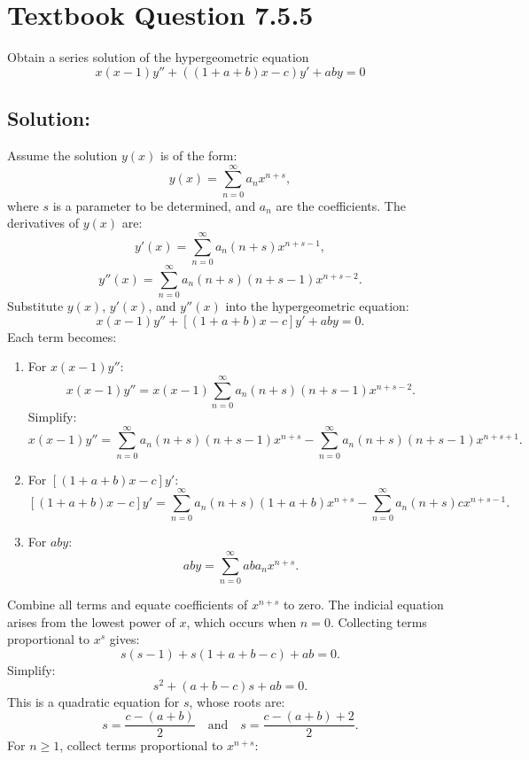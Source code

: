 \documentclass[12pt]{article}
\begin{document}
\section*{Textbook Question 7.5.5}
    Obtain a series solution of the hypergeometric equation
    \[
        x(x-1)y'' + \left((1 + a + b)x - c \right) y' + aby = 0
    \]
   
   \subsection*{Solution:}
        Assume the solution \(y(x)\) is of the form:
        \[
        y(x) = \sum_{n=0}^\infty a_n x^{n+s},
        \]
        where \(s\) is a parameter to be determined, and \(a_n\) are the coefficients.
        The derivatives of \(y(x)\) are:
        \[
        y'(x) = \sum_{n=0}^\infty a_n (n+s)x^{n+s-1},
        \]
        \[
        y''(x) = \sum_{n=0}^\infty a_n (n+s)(n+s-1)x^{n+s-2}.
        \]
        Substitute \(y(x)\), \(y'(x)\), and \(y''(x)\) into the hypergeometric equation:
        \[
        x(x-1)y'' + [(1+a+b)x - c]y' + aby = 0.
        \]
        Each term becomes:
        \begin{enumerate}
            \item For \(x(x-1)y''\):
            \[
            x(x-1)y'' = x(x-1)\sum_{n=0}^\infty a_n (n+s)(n+s-1)x^{n+s-2}.
            \]
            Simplify:
            \[
            x(x-1)y'' = \sum_{n=0}^\infty a_n (n+s)(n+s-1)x^{n+s} - \sum_{n=0}^\infty a_n (n+s)(n+s-1)x^{n+s+1}.
            \]
        
            \item For \([(1+a+b)x - c]y'\):
            \[
            [(1+a+b)x - c]y' = \sum_{n=0}^\infty a_n (n+s)(1+a+b)x^{n+s} - \sum_{n=0}^\infty a_n (n+s)c x^{n+s-1}.
            \]
            \item For \(aby\):
            \[
            aby = \sum_{n=0}^\infty ab a_n x^{n+s}.
            \]
        \end{enumerate}
        Combine all terms and equate coefficients of \(x^{n+s}\) to zero.
        The indicial equation arises from the lowest power of \(x\), which occurs when \(n = 0\). Collecting terms proportional to \(x^s\) gives:
        \[
        s(s-1) + s(1+a+b-c) + ab = 0.
        \]
        Simplify:
        \[
        s^2 + (a+b-c)s + ab = 0.
        \]
        This is a quadratic equation for \(s\), whose roots are:
        \[
        s = \frac{c - (a+b)}{2} \quad \text{and} \quad s = \frac{c - (a+b) + 2}{2}.
        \]
        For \(n \geq 1\), collect terms proportional to \(x^{n+s}\):
\end{document}
